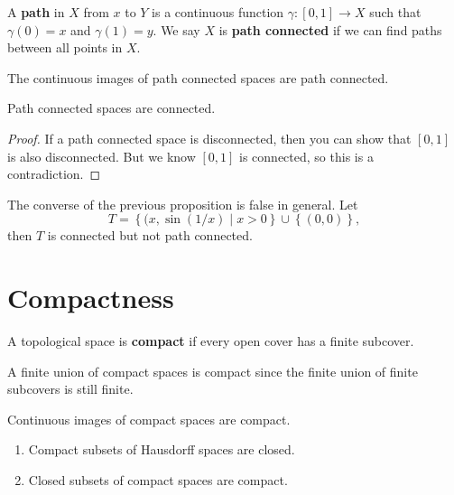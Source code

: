 \documentclass[twoside,10pt]{report}
\begin{document}
\begin{defn}[]
	A \textbf{path} in $X$ from $x$ to $Y$ is a continuous function $\gamma:[0,1]\to X$ such that $\gamma(0)=x$ and $\gamma(1)=y$. We say $X$ is \textbf{path connected} if we can find paths between all points in $X$.
\end{defn}

\begin{prop}
The continuous images of path connected spaces are path connected.
\end{prop}

\begin{prop}
Path connected spaces are connected.
\end{prop}
\begin{proof}
	If a path connected space is disconnected, then you can show that $[0,1]$ is also disconnected. But we know $[0,1]$ is connected, so this is a contradiction.
\end{proof}

\begin{ex}
The converse of the previous proposition is false in general. Let
\[
	T = \left\{ (x,\sin(1/x) \;|\; x>0 \right\} \cup \left\{ (0,0) \right\},
\] then $T$ is connected but not path connected.
\end{ex}


\section{Compactness}

\begin{defn}[]
	A topological space is \textbf{compact} if every open cover has a finite subcover.
\end{defn}

A finite union of compact spaces is compact since the finite union of finite subcovers is still finite.

\begin{prop}
Continuous images of compact spaces are compact.
\end{prop}

\begin{prop}
	\begin{enumerate}
		\item Compact subsets of Hausdorff spaces are closed.
		\item Closed subsets of compact spaces are compact.
	\end{enumerate}
\end{prop}
\end{document}
